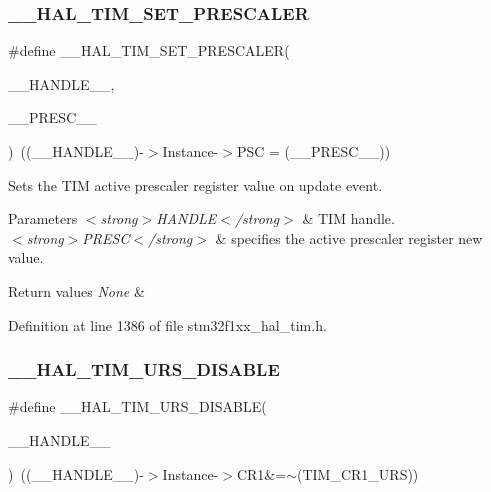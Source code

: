 \subsubsection{\texorpdfstring{\+\_\+\+\_\+\+H\+A\+L\+\_\+\+T\+I\+M\+\_\+\+S\+E\+T\+\_\+\+P\+R\+E\+S\+C\+A\+L\+ER}{\_\_HAL\_TIM\_SET\_PRESCALER}}
{\footnotesize\ttfamily \#define \+\_\+\+\_\+\+H\+A\+L\+\_\+\+T\+I\+M\+\_\+\+S\+E\+T\+\_\+\+P\+R\+E\+S\+C\+A\+L\+ER(\begin{DoxyParamCaption}\item[{}]{\+\_\+\+\_\+\+H\+A\+N\+D\+L\+E\+\_\+\+\_\+,  }\item[{}]{\+\_\+\+\_\+\+P\+R\+E\+S\+C\+\_\+\+\_\+ }\end{DoxyParamCaption})~((\+\_\+\+\_\+\+H\+A\+N\+D\+L\+E\+\_\+\+\_\+)-\/$>$Instance-\/$>$P\+SC = (\+\_\+\+\_\+\+P\+R\+E\+S\+C\+\_\+\+\_\+))}



Sets the T\+IM active prescaler register value on update event. 


\begin{DoxyParams}{Parameters}
{\em $<$strong$>$\+H\+A\+N\+D\+L\+E$<$/strong$>$} & T\+IM handle. \\
\hline
{\em $<$strong$>$\+P\+R\+E\+S\+C$<$/strong$>$} & specifies the active prescaler register new value. \\
\hline
\end{DoxyParams}

\begin{DoxyRetVals}{Return values}
{\em None} & \\
\hline
\end{DoxyRetVals}


Definition at line 1386 of file stm32f1xx\+\_\+hal\+\_\+tim.\+h.

\mbox{\label{group___t_i_m___exported___macros_gafacb551a4c537e62a0fe740b2f12236c}} 
\subsubsection{\texorpdfstring{\+\_\+\+\_\+\+H\+A\+L\+\_\+\+T\+I\+M\+\_\+\+U\+R\+S\+\_\+\+D\+I\+S\+A\+B\+LE}{\_\_HAL\_TIM\_URS\_DISABLE}}
{\footnotesize\ttfamily \#define \+\_\+\+\_\+\+H\+A\+L\+\_\+\+T\+I\+M\+\_\+\+U\+R\+S\+\_\+\+D\+I\+S\+A\+B\+LE(\begin{DoxyParamCaption}\item[{}]{\+\_\+\+\_\+\+H\+A\+N\+D\+L\+E\+\_\+\+\_\+ }\end{DoxyParamCaption})~((\+\_\+\+\_\+\+H\+A\+N\+D\+L\+E\+\_\+\+\_\+)-\/$>$Instance-\/$>$C\+R1\&=$\sim$(T\+I\+M\+\_\+\+C\+R1\+\_\+\+U\+RS))}



